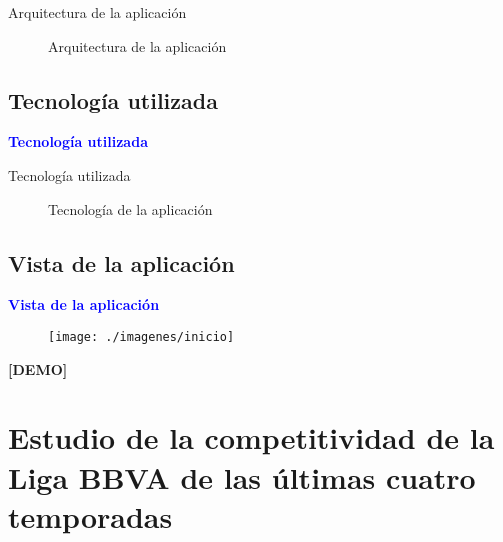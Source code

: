 \documentclass[10pt,hyperref={unicode}]{beamer}
\begin{document}
	\begin{frame}{Arquitectura de la aplicación}
		\begin{figure}
			\centering
			\resizebox{!}{0.7\textheight}{\arquitectura}
			\caption{Arquitectura de la aplicación}
			\label{fig:arquitectura}
		\end{figure}
	\end{frame}
	
	\subsection{Tecnología utilizada}
	
	\begin{frame}
		\begin{center}
			\Huge\textbf{\textsf{\textcolor{blue}{Tecnología utilizada}}}
		\end{center}
	\end{frame}
	
	\begin{frame}{Tecnología utilizada}
		\begin{figure}
			\centering
			\resizebox{!}{0.7\textheight}{\tecnologia}
			\caption{Tecnología de la aplicación}
			\label{fig:tecnologia}
		\end{figure}
	\end{frame}
	
	\subsection{Vista de la aplicación}
	
	\begin{frame}
		\begin{center}
			\Huge\textbf{\textsf{\textcolor{blue}{Vista de la aplicación}}}\\
			
			\begin{figure}
			\centering
			\texttt{[image: ./imagenes/inicio]}
			\end{figure}
	
			\Huge\textbf{\textsf{{[DEMO]}}}
		\end{center}
	\end{frame}
	

	\section{Estudio de la competitividad de la Liga BBVA de las últimas cuatro temporadas}
	
\end{document}
